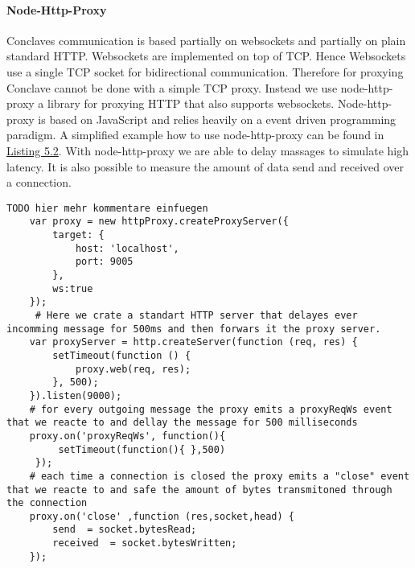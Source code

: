  \paragraph{Node-Http-Proxy}
 Conclaves communication is based partially on websockets and partially on plain standard HTTP.
 Websockets are implemented on top of TCP. Hence Websockets use a single TCP socket for bidirectional communication. Therefore for proxying Conclave cannot be done with a simple TCP proxy. Instead we use node-http-proxy a library for proxying HTTP that also supports websockets. Node-http-proxy is based on JavaScript and relies heavily on a event driven programming paradigm. A simplified example how to use node-http-proxy can be found in \hyperref[the_label]{Listing 5.2}. With node-http-proxy we are able to delay massages to simulate high latency. It is also possible to measure the amount of data send and received over a connection.
 
  \label{the_label}				
 \begin{lstlisting}[caption={Setting up a proxy that simulates latency with node-http-proxy}]
  TODO hier mehr kommentare einfuegen
 	var proxy = new httpProxy.createProxyServer({
 		target: {
 			host: 'localhost',
 			port: 9005
 		},
 		ws:true 
 	});
 	 # Here we crate a standart HTTP server that delayes ever incomming message for 500ms and then forwars it the proxy server.
 	var proxyServer = http.createServer(function (req, res) {
 		setTimeout(function () {
 			proxy.web(req, res);
 		}, 500);
 	}).listen(9000);
 	# for every outgoing message the proxy emits a proxyReqWs event that we reacte to and dellay the message for 500 milliseconds
 	proxy.on('proxyReqWs', function(){
 		 setTimeout(function(){ },500) 
 	 });
  	# each time a connection is closed the proxy emits a "close" event that we reacte to and safe the amount of bytes transmitoned through the connection
 	proxy.on('close' ,function (res,socket,head) { 
 		send  = socket.bytesRead;
 		received  = socket.bytesWritten;
 	});
 \end{lstlisting}

 